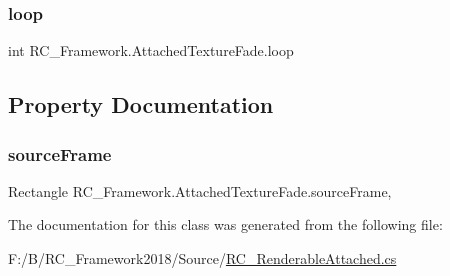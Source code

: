 \subsubsection{\texorpdfstring{loop}{loop}}
{\footnotesize\ttfamily int R\+C\+\_\+\+Framework.\+Attached\+Texture\+Fade.\+loop}



\subsection{Property Documentation}
\mbox{\label{class_r_c___framework_1_1_attached_texture_fade_a2b22f8a915cad35ae249c3cab1b8272b}} 
\subsubsection{\texorpdfstring{source\+Frame}{sourceFrame}}
{\footnotesize\ttfamily Rectangle R\+C\+\_\+\+Framework.\+Attached\+Texture\+Fade.\+source\+Frame\hspace{0.3cm}{\ttfamily [get]}, {\ttfamily [set]}}



The documentation for this class was generated from the following file\+:\begin{DoxyCompactItemize}
\item 
F\+:/\+B/\+R\+C\+\_\+\+Framework2018/\+Source/\mbox{\hyperlink{_r_c___renderable_attached_8cs}{R\+C\+\_\+\+Renderable\+Attached.\+cs}}\end{DoxyCompactItemize}

